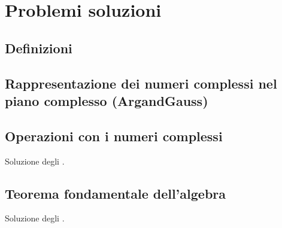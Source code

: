 \documentclass[letterpaper,10pt,italian]{jupyterBook}
\begin{document}
\section{Problemi \sphinxhyphen{} soluzioni}
\label{\detokenize{ch/algebra/complex-algebra-sol:problemi-soluzioni}}\label{\detokenize{ch/algebra/complex-algebra-sol:math-hs-algebra-complex-problems}}\label{\detokenize{ch/algebra/complex-algebra-sol::doc}}

\subsection{Definizioni}
\label{\detokenize{ch/algebra/complex-algebra-sol:definizioni}}\label{\detokenize{ch/algebra/complex-algebra-sol:math-hs-algebra-complex-problems-def}}

\subsection{Rappresentazione dei numeri complessi nel piano complesso (Argand\sphinxhyphen{}Gauss)}
\label{\detokenize{ch/algebra/complex-algebra-sol:rappresentazione-dei-numeri-complessi-nel-piano-complesso-argand-gauss}}\label{\detokenize{ch/algebra/complex-algebra-sol:math-hs-algebra-complex-problems-complex-plane-sol}}

\subsection{Operazioni con i numeri complessi}
\label{\detokenize{ch/algebra/complex-algebra-sol:operazioni-con-i-numeri-complessi}}\label{\detokenize{ch/algebra/complex-algebra-sol:math-hs-algebra-complex-problems-operations-sol}}
\sphinxAtStartPar
Soluzione degli {\hyperref[\detokenize{ch/algebra/complex-algebra-problems:math-hs-algebra-complex-problems-operations-cc-re-im}]{}}.


\subsection{Teorema fondamentale dell’algebra}
\label{\detokenize{ch/algebra/complex-algebra-sol:teorema-fondamentale-dell-algebra}}\label{\detokenize{ch/algebra/complex-algebra-sol:math-hs-algebra-complex-fund-thm-sol}}
\sphinxAtStartPar
Soluzione degli {\hyperref[\detokenize{ch/algebra/complex-algebra-problems:math-hs-algebra-complex-fund-thm-ex}]{}}.
\end{document}
